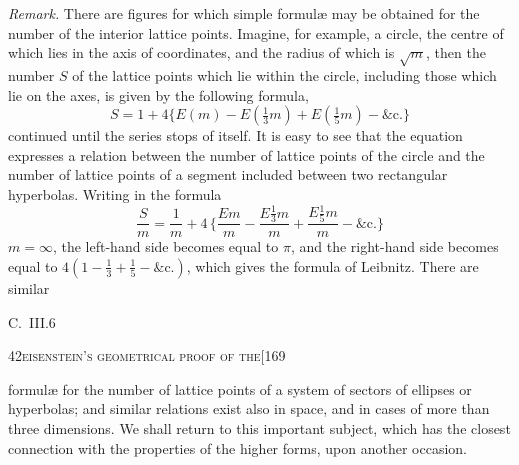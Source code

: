 \documentclass[11pt]{article}
\begin{document}
\textit{Remark.} There are figures for which simple formul\ae{} may be obtained for the
number of the interior lattice points. Imagine, for example, a circle, the centre of
which lies in the axis of coordinates, and the radius of which is $\sqrt{m}$, then the number
$S$ of the lattice points which lie within the circle, including those which lie on the
axes, is given by the following formula,
\[
S = 1 + 4\{E(m) - E(\tfrac{1}{3} m) + E(\tfrac{1}{5} m) - \&\text{c.}\}
\]
continued until the series stops of itself. It is easy to see that the equation expresses
a relation between the number of lattice points of the circle and the number of lattice
points of a segment included between two rectangular hyperbolas. Writing in the
formula
\[
\frac{S}{m} = \frac{1}{m} + 4\,\biggl\{\frac{Em}{m} - \frac{E\tfrac{1}{3}m}{m} + \frac{E\tfrac{1}{5}m}{m} - \&\text{c.}\biggr\}
\]
$m = \infty$, the left-hand side becomes equal to $\pi$, and the right-hand side becomes
equal to $4(1 - \tfrac{1}{3} + \tfrac{1}{5} - \&\text{c.})$, which gives the formula of Leibnitz. There are similar

\begin{flushright}\small C.\ III.\hfill 6\end{flushright}

\newpage

\begin{center}
\small\textsc{42}\hfill\textsc{eisenstein's geometrical proof of the}\hfill[169
\end{center}

\medskip

\noindent formul\ae{} for the number of lattice points of a system of sectors of ellipses or hyperbolas;
and similar relations exist also in space, and in cases of more than three
dimensions. We shall return to this important subject, which has the closest connection
with the properties of the higher forms, upon another occasion.
\end{document}
